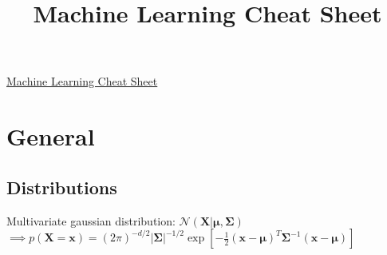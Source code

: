 \documentclass[10pt,a4paper,landscape]{article}
\renewcommand{\bf}[1]{\ensuremath{\mathbf{#1}}}
\begin{document}
\title{Machine Learning Cheat Sheet}

\raggedright
\footnotesize
\sffamily
\begin{multicols*}{4}

\setlength{\premulticols}{1pt}
\setlength{\postmulticols}{1pt}
\setlength{\multicolsep}{1pt}
\setlength{\columnsep}{2pt}

\begin{center}
\Large{\underline{Machine Learning Cheat Sheet}}
\end{center}

\section{General}





\subsection{Distributions}
Multivariate gaussian distribution: $\mathcal{N}(\bf{X} | \bf{\mu} , \bf{\Sigma})$ \\
$\implies p(\bf{X} = \bf{x}) = (2 \pi)^{-d/2} |\bf{\Sigma|}^{-1/2} \exp{[- \frac{1}{2} (\bf{x} - \bf{\mu})^T \bf{\Sigma}^{-1} (\bf{x} - \bf{\mu})]}$


\end{multicols*}
\end{document}
